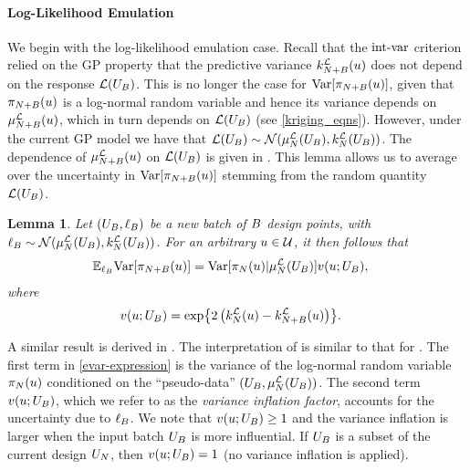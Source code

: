\documentclass[12pt]{article}
\newtheorem{lemma}{Lemma}
\begin{document}
\paragraph{Log-Likelihood Emulation}
We begin with the log-likelihood emulation case. Recall that the 
$\intvarLabel$ criterion relied on the GP property that the predictive variance $\emKer[\Naugment]{\llik}(\Par)$
does not depend on the response $\llik(\designBatchIn)$. This is no longer the case for 
$\Var[\llikEmRdmDens[\Naugment](\Par)]$, given that $\llikEmRdmDens[\Naugment](\Par)$ is a log-normal 
random variable and hence its variance depends on $\emMean[\Naugment]{\llik}(\Par)$,  
which in turn depends on $\llik(\designBatchIn)$ (see \ref{kriging_eqns}). 
However, under the current GP model we have that 
$\llik(\designBatchIn) \sim \Gaussian(\emMean[\Ndesign]{\llik}(\designBatchIn), \emKer[\Ndesign]{\llik}(\designBatchIn))$.
The dependence of $\emMean[\Naugment]{\llik}(\Par)$ on $\llik(\designBatchIn)$ is given in 
. This lemma allows us to average over the uncertainty in  
$\Var[\llikEmRdmDens[\Naugment](\Par)]$ stemming from the random quantity $\llik(\designBatchIn)$. 
\begin{lemma} \label{lemma:evar}
Let $(\designBatchIn, \designBatchLlik)$ be a new batch of $\Nbatch$ design points, with 
$\designBatchLlik \sim \Gaussian(\emMean[\Ndesign]{\llik}(\designBatchIn), \emKer[\Ndesign]{\llik}(\designBatchIn))$. 
For an arbitrary $\Par \in \parSpace$, it then follows that 
\begin{align}
\E_{\designBatchLlik} \Var[\llikEmRdmDens[\Naugment](\Par)]
&= \Var[\llikEmRdmDens[\Ndesign](\Par) | \emMean[\Ndesign]{\llik}(\designBatchIn)]
	\varInflation(\Par; \designBatchIn), \label{evar-expression}
\end{align}
where 
\begin{align}
\varInflation(\Par; \designBatchIn)
&= \Exp{2\left(\emKer[\Ndesign]{\llik}(\Par) - \emKer[\Naugment]{\llik}(\Par)\right)}. \label{var_inflation_factor}
\end{align}
\end{lemma}
A similar result is derived in \cite{VehtariParallelGP}.
The interpretation of  is similar to that for . 
The first term in \ref{evar-expression} is the variance of the log-normal random variable
 $\llikEmRdmDens[\Ndesign](\Par)$ conditioned on the ``pseudo-data''
 $(\designBatchIn, \emMean[\Ndesign]{\llik}(\designBatchIn))$. The second term 
 $\varInflation(\Par; \designBatchIn)$, which we refer to as the \textit{variance inflation factor}, 
 accounts for the uncertainty due to $\designBatchLlik$. We note that 
$\varInflation(\Par; \designBatchIn) \geq 1$ and the variance inflation is larger when the 
input batch $\designBatchIn$ is more influential. If $\designBatchIn$ is a subset of the 
current design $\designIn[\Ndesign]$, then $\varInflation(\Par; \designBatchIn) = 1$ (no 
variance inflation is applied). 
\end{document}

